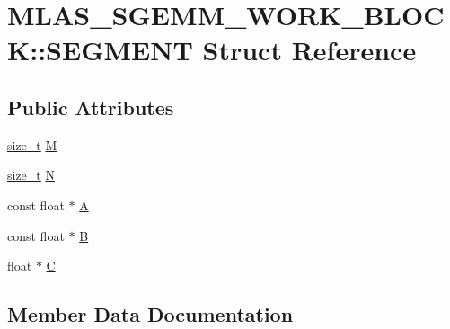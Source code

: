 \hypertarget{structMLAS__SGEMM__WORK__BLOCK_1_1SEGMENT}{}\section{M\+L\+A\+S\+\_\+\+S\+G\+E\+M\+M\+\_\+\+W\+O\+R\+K\+\_\+\+B\+L\+O\+CK\+:\+:S\+E\+G\+M\+E\+NT Struct Reference}
\label{structMLAS__SGEMM__WORK__BLOCK_1_1SEGMENT}
\subsection*{Public Attributes}
\begin{DoxyCompactItemize}
\item 
\mbox{\hyperlink{mlasi_8h_a503efbc1c6e50825320ad909366b78ab}{size\+\_\+t}} \mbox{\hyperlink{structMLAS__SGEMM__WORK__BLOCK_1_1SEGMENT_aa52359e1d70bc45a3e92705ab10b7847}{M}}
\item 
\mbox{\hyperlink{mlasi_8h_a503efbc1c6e50825320ad909366b78ab}{size\+\_\+t}} \mbox{\hyperlink{structMLAS__SGEMM__WORK__BLOCK_1_1SEGMENT_a7103b18d1b873908c7d27312352262ee}{N}}
\item 
const float $\ast$ \mbox{\hyperlink{structMLAS__SGEMM__WORK__BLOCK_1_1SEGMENT_a9f414d02d622ae61ba68d9ca9f11b01e}{A}}
\item 
const float $\ast$ \mbox{\hyperlink{structMLAS__SGEMM__WORK__BLOCK_1_1SEGMENT_a1c5355d8d381039ea67c9ec6343aabd0}{B}}
\item 
float $\ast$ \mbox{\hyperlink{structMLAS__SGEMM__WORK__BLOCK_1_1SEGMENT_a1a11502e880eae0139915991d47aa338}{C}}
\end{DoxyCompactItemize}


\subsection{Member Data Documentation}
\mbox{\label{structMLAS__SGEMM__WORK__BLOCK_1_1SEGMENT_a9f414d02d622ae61ba68d9ca9f11b01e}} 
